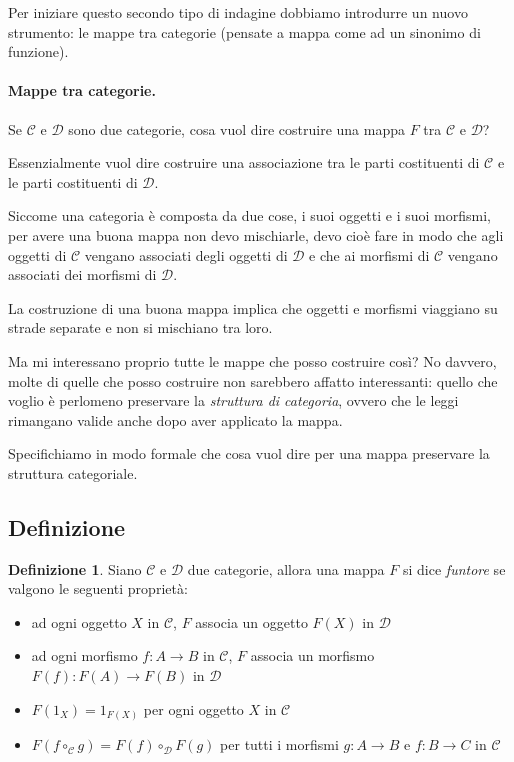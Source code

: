 \documentclass[12pt]{article}
\theoremstyle{definition}
\newtheorem{definition}{Definizione}[section]
\begin{document}
Per iniziare questo secondo tipo di indagine dobbiamo introdurre un nuovo strumento: le mappe tra categorie
(pensate a mappa come ad un sinonimo di funzione).

\paragraph{Mappe tra categorie.} Se $\mathcal{C}$ e $\mathcal{D}$ sono due categorie, cosa vuol dire costruire una mappa $F$ tra $\mathcal{C}$ e $\mathcal{D}$?

Essenzialmente vuol dire costruire una associazione tra le parti costituenti di $\mathcal{C}$ e le parti costituenti di $\mathcal{D}$.

Siccome una categoria è composta da due cose, i suoi oggetti e i suoi morfismi, per avere una buona mappa non devo mischiarle,
devo cioè fare in modo che agli oggetti di $\mathcal{C}$ vengano associati degli oggetti di $\mathcal{D}$ e che ai morfismi di
$\mathcal{C}$ vengano associati dei morfismi di $\mathcal{D}$.

La costruzione di una buona mappa implica che oggetti e morfismi viaggiano su strade separate e non si mischiano tra loro.

Ma mi interessano proprio tutte le mappe che posso costruire così? No davvero, molte di quelle che posso costruire
non sarebbero affatto interessanti: quello che voglio è perlomeno preservare la \emph{struttura di categoria},
ovvero che le leggi rimangano valide anche dopo aver applicato la mappa.

Specifichiamo in modo formale che cosa vuol dire per una mappa preservare la struttura categoriale.

\subsection{Definizione}

\begin{definition}
Siano $\mathcal{C}$ e $\mathcal{D}$ due categorie, allora una mappa $F$ si dice \emph{funtore} se valgono le seguenti proprietà:

\begin{itemize}
  \item ad ogni oggetto $X$ in $\mathcal{C}$, $F$ associa un oggetto $F(X)$ in $\mathcal{D}$
  \item ad ogni morfismo $f: A \rightarrow B$ in $\mathcal{C}$, $F$ associa un morfismo $F(f): F(A) \rightarrow F(B)$ in $\mathcal{D}$
  \item $F(1_X) = 1_{F(X)}$ per ogni oggetto $X$ in $\mathcal{C}$
  \item $F(f \circ_\mathcal{C} g) = F(f) \circ_\mathcal{D} F(g)$ per tutti i morfismi $g: A \rightarrow B$ e $f: B \rightarrow C$ in $\mathcal{C}$
\end{itemize}

\end{definition}
\end{document}
